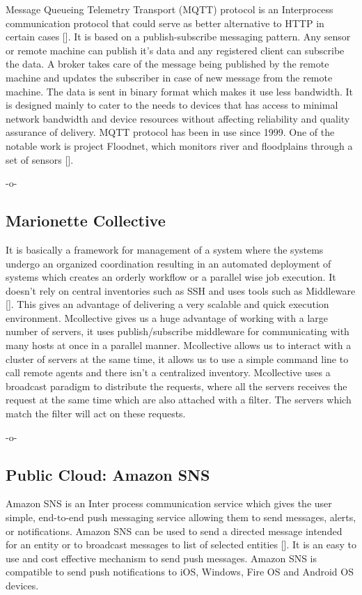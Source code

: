 Message Queueing Telemetry Transport (MQTT) protocol is an
Interprocess communication protocol that could serve as better
alternative to HTTP in certain cases [\cite{www-mqtt}]. It is based on a
publish-subscribe messaging pattern. Any sensor or remote machine can
publish it's data and any registered client can subscribe the data. A
broker takes care of the message being published by the remote machine
and updates the subscriber in case of new message from the remote
machine. The data is sent in binary format which makes it use less
bandwidth. It is designed mainly to cater to the needs to devices that
has access to minimal network bandwidth and device resources without
affecting reliability and quality assurance of delivery. MQTT protocol
has been in use since 1999. One of the notable work is project
Floodnet, which monitors river and floodplains through a set of
sensors [\cite{www-floodnet}].

     -o-

\subsection{Marionette Collective}

It is basically a framework for management of a system where the
systems undergo an organized coordination resulting in an automated
deployment of systems which creates an orderly workflow or a parallel
wise job execution. It doesn't rely on central inventories such as SSH
and uses tools such as Middleware [\cite{www-marionette-webpage}]. This
gives an advantage of delivering a very scalable and quick execution
environment.  Mcollective gives us a huge advantage of working with a
large number of servers, it uses publish/subscribe middleware for
communicating with many hosts at once in a parallel
manner. Mcollective allows us to interact with a cluster of servers at
the same time, it allows us to use a simple command line to call
remote agents and there isn't a centralized inventory. Mcollective
uses a broadcast paradigm to distribute the requests, where all the
servers receives the request at the same time which are also attached
with a filter. The servers which match the filter will act on these
requests.

     -o-
     
\subsection{Public Cloud: Amazon SNS}

Amazon SNS is an Inter process communication service which gives the
user simple, end-to-end push messaging service allowing them to send
messages, alerts, or notifications. Amazon SNS can be used to send a
directed message intended for an entity or to broadcast messages to
list of selected entities [\cite{www-sns-webpage}].  It is an easy to
use and cost effective mechanism to send push messages. Amazon SNS is
compatible to send push notifications to iOS, Windows, Fire OS and
Android OS devices.

